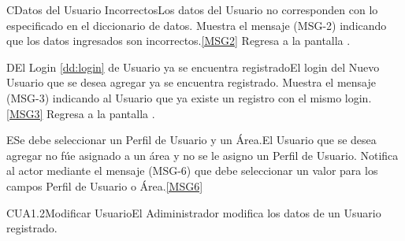 	\begin{UCtrayectoriaA}{C}{Datos del Usuario Incorrectos}{Los datos del Usuario no corresponden con lo especificado en el diccionario de datos.}
			\UCpaso Muestra el mensaje (MSG-2) indicando que los datos ingresados son incorrectos.\ref{MSG2}
			\UCpaso Regresa a la pantalla .
	\end{UCtrayectoriaA}

		\begin{UCtrayectoriaA}{D}{El Login \ref{dd:login} de Usuario ya se encuentra registrado}{El login del Nuevo Usuario que se desea agregar ya se encuentra registrado.}
			\UCpaso Muestra el mensaje (MSG-3) indicando al Usuario que ya existe un registro con el mismo login.\ref{MSG3}
			\UCpaso Regresa a la pantalla .
		\end{UCtrayectoriaA}

		\begin{UCtrayectoriaA}{E}{Se debe seleccionar un Perfil de Usuario y un Área.}{El Usuario que se desea agregar no fúe asignado a un área y no se le asigno un Perfil de Usuario.}	
			\UCpaso Notifica al actor mediante el mensaje (MSG-6) que debe seleccionar un valor para los campos Perfil de Usuario o Área.\ref{MSG6}
		\end{UCtrayectoriaA}



	\begin{UseCase}{CUA1.2}{Modificar Usuario}{El Adiministrador modifica los datos de un Usuario registrado.}
	\end{UseCase}

